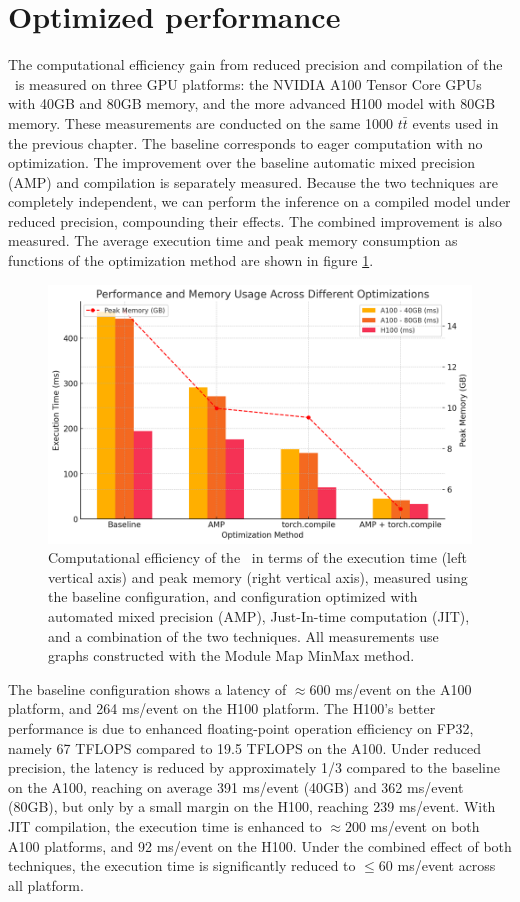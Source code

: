 \section{Optimized performance}
\label{sect:comp-performance}
The computational efficiency gain from reduced precision and compilation of the \ignn~is measured on three GPU platforms: the NVIDIA A100 Tensor Core GPUs with 40GB and 80GB memory, and the more advanced H100 model with 80GB memory.
These measurements are conducted on the same 1000 $t\bar{t}$ events used in the previous chapter.
The baseline corresponds to eager computation with no optimization. 
The improvement over the baseline automatic mixed precision (AMP) and compilation is separately measured.
Because the two techniques are completely independent, we can perform the inference on a compiled model under reduced precision, compounding their effects.
The combined improvement is also measured.
The average execution time and peak memory consumption as functions of the optimization method are shown in figure \ref{fig:gnn-opt}. 

\begin{figure}[h!]
    \centering
    \includegraphics[width=0.8\linewidth]{figures/compute-opt.png}
    \caption{Computational efficiency of the \ignn~in terms of the execution time (left vertical axis) and peak memory (right vertical axis), measured using the baseline configuration, and configuration optimized with automated mixed precision (AMP), Just-In-time computation (JIT), and a combination of the two techniques. All measurements use graphs constructed with the Module Map MinMax method.}
    \label{fig:gnn-opt}
\end{figure}

The baseline configuration shows a latency of $\approx600$ ms/event on the A100 platform, and 264 ms/event on the H100 platform.
The H100's better performance is due to enhanced floating-point operation efficiency on FP32, namely 67 TFLOPS compared to 19.5 TFLOPS on the A100.
Under reduced precision, the latency is reduced by approximately 1/3 compared to the baseline on the A100, reaching on average 391 ms/event (40GB) and 362 ms/event (80GB), but only by a small margin on the H100, reaching 239 ms/event.
With JIT compilation, the execution time is enhanced to $\approx 200$ ms/event on both A100 platforms, and 92 ms/event on the H100.
Under the combined effect of both techniques, the execution time is significantly reduced to $\le 60$ ms/event across all platform. 


